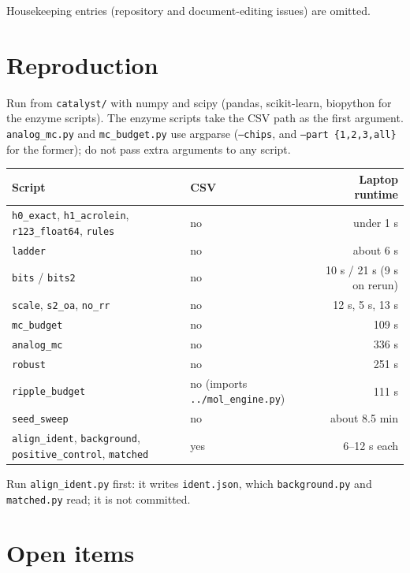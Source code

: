 \documentclass[11pt]{article}
\newcommand{\scr}[1]{\texttt{#1}}
\begin{document}
Housekeeping entries (repository and document-editing issues) are omitted.

\section{Reproduction}

Run from \scr{catalyst/} with numpy and scipy (pandas, scikit-learn, biopython for the enzyme scripts). The enzyme scripts take the CSV path as the first argument. \scr{analog\_mc.py} and \scr{mc\_budget.py} use argparse (\scr{--chips}, and \scr{--part \{1,2,3,all\}} for the former); do not pass extra arguments to any script.

\begin{center}
\small
\begin{tabularx}{\textwidth}{@{}Llr@{}}
\toprule
Script & CSV & Laptop runtime \\
\midrule
\scr{h0\_exact}, \scr{h1\_acrolein}, \scr{r123\_float64}, \scr{rules} & no & under 1 s \\
\scr{ladder} & no & about 6 s \\
\scr{bits} / \scr{bits2} & no & 10 s / 21 s (9 s on rerun) \\
\scr{scale}, \scr{s2\_oa}, \scr{no\_rr} & no & 12 s, 5 s, 13 s \\
\scr{mc\_budget} & no & 109 s \\
\scr{analog\_mc} & no & 336 s \\
\scr{robust} & no & 251 s \\
\scr{ripple\_budget} & no (imports \scr{../mol\_engine.py}) & 111 s \\
\scr{seed\_sweep} & no & about 8.5 min \\
\scr{align\_ident}, \scr{background}, \scr{positive\_control}, \scr{matched} & yes & 6--12 s each \\
\bottomrule
\end{tabularx}
\end{center}

Run \scr{align\_ident.py} first: it writes \scr{ident.json}, which \scr{background.py} and \scr{matched.py} read; it is not committed.

\section{Open items}
\end{document}
